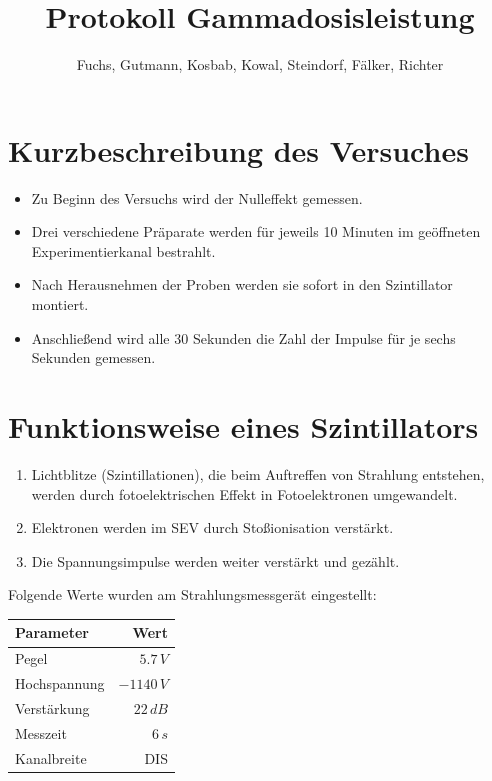 \documentclass[12pt,german]{article}
\title{\vspace{-1.5cm}Protokoll Gammadosisleistung}
\author{Fuchs, Gutmann, Kosbab, Kowal, Steindorf, Fälker, Richter}
\begin{document}
    \maketitle
    \tableofcontents

    \section{Kurzbeschreibung des Versuches}
    \begin{itemize}
        \item Zu Beginn des Versuchs wird der Nulleffekt gemessen.
        \item Drei verschiedene Präparate werden für jeweils 10 Minuten im geöffneten Experimentierkanal bestrahlt.
        \item Nach Herausnehmen der Proben werden sie sofort in den Szintillator montiert.
        \item Anschließend wird alle 30 Sekunden die Zahl der Impulse für je sechs Sekunden gemessen.
    \end{itemize}

    \section{Funktionsweise eines Szintillators}
    \begin{enumerate}
        \item Lichtblitze (Szintillationen), die beim Auftreffen von Strahlung entstehen, werden durch fotoelektrischen Effekt in Fotoelektronen umgewandelt.
        \item Elektronen werden im SEV durch Stoßionisation verstärkt.
        \item Die Spannungsimpulse werden weiter verstärkt und gezählt.
    \end{enumerate}
    Folgende Werte wurden am Strahlungsmessgerät eingestellt:
    \begin{table}[H]
        \centering
        \begin{tabularx}{0.7\textwidth}{L|R}
            \toprule
            \textbf{Parameter} & \textbf{Wert} \\
            \midrule
            Pegel & $5.7\, V$ \\
            Hochspannung & $-1140\, V$ \\
            Verstärkung & $22\, dB$ \\
            Messzeit & $6\, s$ \\
            Kanalbreite & DIS \\
            \bottomrule
        \end{tabularx}
    \end{table}
\end{document}
